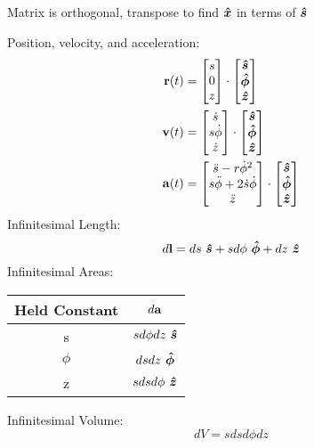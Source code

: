     \begin{center}
    Matrix is orthogonal, transpose to find $\e{x}$ in terms of $\e{s}$
    \vspace{0.5 cm}
    \end{center}
    Position, velocity, and acceleration:
    \begin{align*}
        \vb{r}(t)&=
        \begin{bmatrix}
            s
            \\
            0
            \\
            z
        \end{bmatrix}
        \cdot
        \begin{bmatrix}
            \e{s}
            \\
            \e{\phi}
            \\
            \e{z}
        \end{bmatrix}
        \\
        \vb{v}(t)&=
        \begin{bmatrix}
            \dot{s}
            \\
            s\dot{\phi}
            \\
            \dot{z}
        \end{bmatrix}
        \cdot
        \begin{bmatrix}
            \e{s}
            \\
            \e{\phi}
            \\
            \e{z}
        \end{bmatrix}
        \\
        \vb{a}(t)&=
        \begin{bmatrix}
            \Ddot{s}-r\dot{\phi}^2
            \\
            s\Ddot{\phi}+2\dot{s}\dot{\phi}
            \\
            \Ddot{z}
        \end{bmatrix}
        \cdot
        \begin{bmatrix}
            \e{s}
            \\
            \e{\phi}
            \\
            \e{z}
        \end{bmatrix}
    \end{align*}
    \newpage\noindent
    Infinitesimal Length:
        \[\dl*= ds\ \e{s}+sd\phi\ \e{\phi}+dz\ \e{z}\]
    Infinitesimal Areas:
        \begin{center}
        \begin{tabular}{|c|c|}
            \hline
            Held Constant & $\da*$ \\ 
            \hline
            s & $sd\phi dz\ \e{s}$ \\ 
            \hline
            $\phi$ & $dsdz\ \e{\phi}$  \\ 
            \hline
            z & $sdsd\phi\ \e{z}$\\
            \hline
        \end{tabular}
        \end{center}
    Infinitesimal Volume: \[dV=sdsd\phi dz\]
